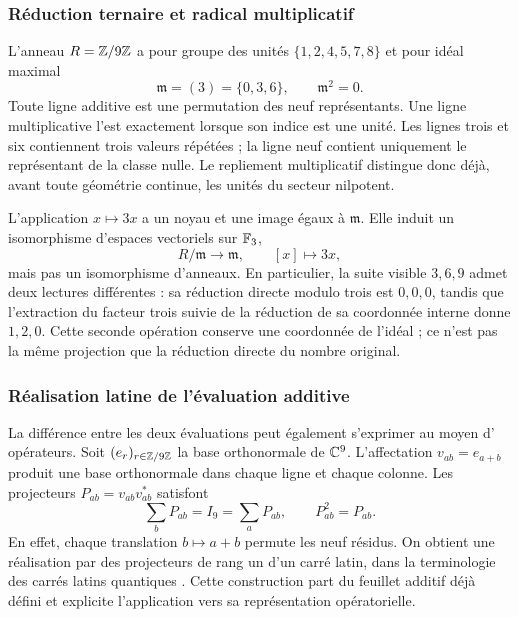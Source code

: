 \subsubsection{Réduction ternaire et radical multiplicatif}

L'anneau \(R=\mathbb Z/9\mathbb Z\) a pour groupe des unités \(\{1,2,4,5,7,8\}\) et pour idéal maximal
\[
 \mathfrak m=(3)=\{0,3,6\},\qquad\mathfrak m^2=0.
\]
Toute ligne additive est une permutation des neuf représentants. Une ligne multiplicative l'est exactement lorsque son indice est une unité. Les lignes trois et six contiennent trois valeurs répétées ; la ligne neuf contient uniquement le représentant de la classe nulle. Le repliement multiplicatif distingue donc déjà, avant toute géométrie continue, les unités du secteur nilpotent.

L'application \(x\mapsto3x\) a un noyau et une image égaux à \(\mathfrak m\). Elle induit un isomorphisme d'espaces vectoriels sur \(\mathbb F_3\),
\[
 R/\mathfrak m\longrightarrow\mathfrak m,\qquad [x]\longmapsto3x,
\]
mais pas un isomorphisme d'anneaux. En particulier, la suite visible \(3,6,9\) admet deux lectures différentes : sa réduction directe modulo trois est \(0,0,0\), tandis que l'extraction du facteur trois suivie de la réduction de sa coordonnée interne donne \(1,2,0\). Cette seconde opération conserve une coordonnée de l'idéal ; ce n'est pas la même projection que la réduction directe du nombre original.

\subsubsection{Réalisation latine de l'évaluation additive}

La différence entre les deux évaluations peut également s'exprimer au moyen d'
opérateurs. Soit \((e_r)_{r\in\mathbb Z/9\mathbb Z}\) la base orthonormale de \(\mathbb C^9\).
L'affectation \(v_{ab}=e_{a+b}\) produit une base orthonormale dans chaque ligne
et chaque colonne. Les projecteurs \(P_{ab}=v_{ab}v_{ab}^{*}\) satisfont
\[
 \sum_bP_{ab}=I_9=\sum_aP_{ab},\qquad P_{ab}^2=P_{ab}.
\]
En effet, chaque translation \(b\mapsto a+b\) permute les neuf résidus. On obtient une réalisation par des projecteurs de rang un d'un carré latin, dans la terminologie des carrés latins quantiques \cite{mustovicary,delascuevas2023}. Cette construction part du feuillet additif déjà défini et explicite l'application vers sa représentation opératorielle.

